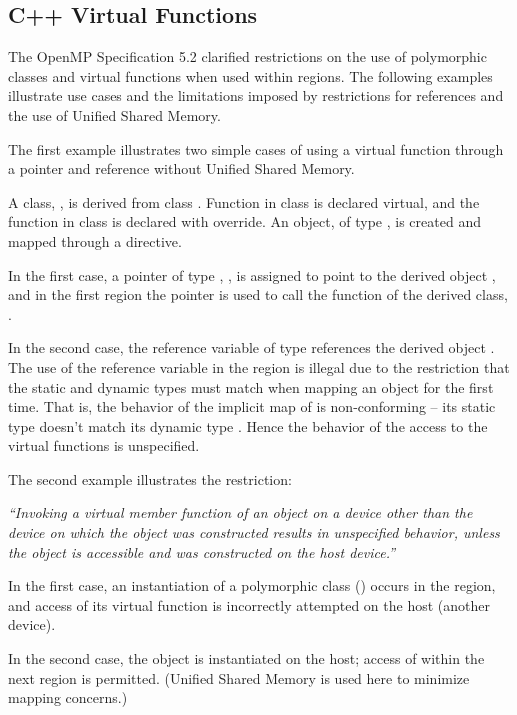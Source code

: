 \begin{cppspecific}[4ex]
\section{C++ Virtual Functions}
\label{sec:virtual_functions}


The OpenMP Specification 5.2 clarified restrictions on the use
of polymorphic classes and virtual functions when used within 
 regions. The following examples illustrate 
use cases and the limitations imposed by restrictions for
references and the use of Unified Shared Memory. 

The first example illustrates two simple cases of using a virtual function
through a pointer and reference without Unified Shared Memory. 

A class, , is derived from class .  
Function  in class  is declared
virtual, and the function  in class  is declared with override.
An object,  of type , is created and mapped through a 
directive.

In the first case, a pointer of type , , is assigned to point 
to the derived object , and in the first  region the pointer
is used to call the  function of the derived class, .

In the second case, the reference variable  of type  references 
the derived object .  The use of the reference variable  
in the  region is illegal due to the restriction that the static and dynamic 
types must match when mapping an object for the first time.
That is, the behavior of the implicit map of  
is non-conforming -- its static type  doesn't match its dynamic type .  
Hence the behavior of the access to the virtual functions is unspecified.


The second example illustrates the restriction:

\emph{``Invoking a virtual member function of an object on a device other than the device on which the
object was constructed results in unspecified behavior, unless the object is accessible and was
constructed on the host device.''}

In the first case, an instantiation  of a polymorphic class () occurs in the 
 region, and access of its virtual function
is incorrectly attempted on the host (another device).

In the second case, the object  is instantiated on the host; access of  within
the next  region is permitted. (Unified Shared Memory is
used here to minimize mapping concerns.)

\end{cppspecific}
